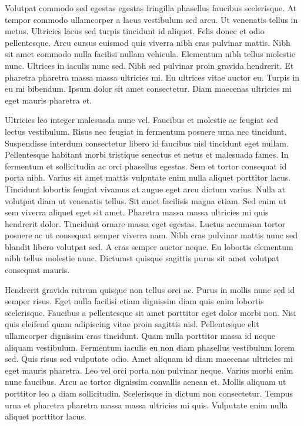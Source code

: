 \documentclass[11pt,a4paper]{article}
\begin{document}
Volutpat commodo sed egestas egestas fringilla phasellus faucibus scelerisque. At tempor commodo ullamcorper a lacus vestibulum sed arcu. Ut venenatis tellus in metus. Ultricies lacus sed turpis tincidunt id aliquet. Felis donec et odio pellentesque. Arcu cursus euismod quis viverra nibh cras pulvinar mattis. Nibh sit amet commodo nulla facilisi nullam vehicula. Elementum nibh tellus molestie nunc. Ultrices in iaculis nunc sed. Nibh sed pulvinar proin gravida hendrerit. Et pharetra pharetra massa massa ultricies mi. Eu ultrices vitae auctor eu. Turpis in eu mi bibendum. Ipsum dolor sit amet consectetur. Diam maecenas ultricies mi eget mauris pharetra et.

Ultricies leo integer malesuada nunc vel. Faucibus et molestie ac feugiat sed lectus vestibulum. Risus nec feugiat in fermentum posuere urna nec tincidunt. Suspendisse interdum consectetur libero id faucibus nisl tincidunt eget nullam. Pellentesque habitant morbi tristique senectus et netus et malesuada fames. In fermentum et sollicitudin ac orci phasellus egestas. Sem et tortor consequat id porta nibh. Varius sit amet mattis vulputate enim nulla aliquet porttitor lacus. Tincidunt lobortis feugiat vivamus at augue eget arcu dictum varius. Nulla at volutpat diam ut venenatis tellus. Sit amet facilisis magna etiam. Sed enim ut sem viverra aliquet eget sit amet. Pharetra massa massa ultricies mi quis hendrerit dolor. Tincidunt ornare massa eget egestas. Luctus accumsan tortor posuere ac ut consequat semper viverra nam. Nibh cras pulvinar mattis nunc sed blandit libero volutpat sed. A cras semper auctor neque. Eu lobortis elementum nibh tellus molestie nunc. Dictumst quisque sagittis purus sit amet volutpat consequat mauris.

Hendrerit gravida rutrum quisque non tellus orci ac. Purus in mollis nunc sed id semper risus. Eget nulla facilisi etiam dignissim diam quis enim lobortis scelerisque. Faucibus a pellentesque sit amet porttitor eget dolor morbi non. Nisi quis eleifend quam adipiscing vitae proin sagittis nisl. Pellentesque elit ullamcorper dignissim cras tincidunt. Quam nulla porttitor massa id neque aliquam vestibulum. Fermentum iaculis eu non diam phasellus vestibulum lorem sed. Quis risus sed vulputate odio. Amet aliquam id diam maecenas ultricies mi eget mauris pharetra. Leo vel orci porta non pulvinar neque. Varius morbi enim nunc faucibus. Arcu ac tortor dignissim convallis aenean et. Mollis aliquam ut porttitor leo a diam sollicitudin. Scelerisque in dictum non consectetur. Tempus urna et pharetra pharetra massa massa ultricies mi quis. Vulputate enim nulla aliquet porttitor lacus.
\end{document}
